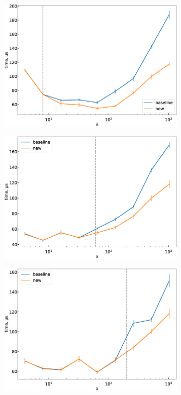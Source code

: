 \documentclass[final,5p,twocolumn,times,authoryear]{elsarticle}
\begin{document}
\begin{figure}[h]
	\centering
	\begin{subfigure}[t]{0.35\textwidth}
		\includegraphics[width=0.92\linewidth]{boost_k_fixed_2.eps}
        \caption{}\label{boost-k-fixed_2}
	\end{subfigure}
	\;
	\begin{subfigure}[t]{0.35\textwidth}
		\includegraphics[width=0.92\linewidth]{boost_k_fixed_15.eps}
		\caption{}\label{boost-k-fixed_15}
	\end{subfigure}
	\;
	\begin{subfigure}[t]{0.35\textwidth}
		\includegraphics[width=0.92\linewidth]{boost_k_fixed_50.eps}

\end{subfigure}
\end{figure}
\end{document}
